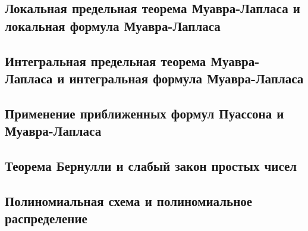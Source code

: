 \documentclass[12pt]{article}
\begin{document}
\subsection{Локальная предельная теорема Муавра-Лапласа и локальная формула Муавра-Лапласа}
\subsection{Интегральная предельная теорема Муавра-Лапласа и интегральная формула Муавра-Лапласа}
\subsection{Применение приближенных формул Пуассона и Муавра-Лапласа}
\subsection{Теорема Бернулли и слабый закон простых чисел}
\subsection{Полиномиальная схема и полиномиальное распределение}
\end{document}
